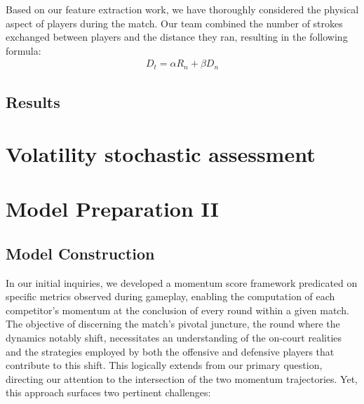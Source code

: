 \documentclass[12pt]{article}  %
\begin{document}
Based on our feature extraction work, we have thoroughly considered the physical aspect of players during the match. 
Our team combined the number of strokes exchanged between players and the distance they ran, resulting in the following formula:
\begin{align} %
    D_t = \alpha R_n + \beta D_n
\end{align}

\subsection{Results}

\section{Volatility stochastic assessment}














\section{Model Preparation II}

\subsection{Model Construction}
In our initial inquiries, we developed a momentum score framework predicated on specific metrics observed during gameplay, 
enabling the computation of each competitor's momentum at the conclusion of every round within a given match.
The objective of discerning the match's pivotal juncture, the round where the dynamics notably shift, 
necessitates an understanding of the on-court realities and the strategies employed by both the offensive and defensive 
players that contribute to this shift. This logically extends from our primary question, directing our attention to the 
intersection of the two momentum trajectories. Yet, this approach surfaces two pertinent challenges:
\end{document}
